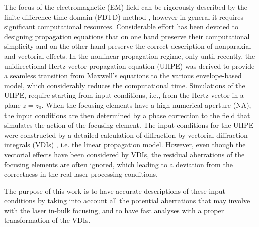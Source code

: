 \documentclass[9pt,twocolumn,twoside]{osajnl}
\begin{document}
The focus of the electromagnetic (EM) field can be rigorously described by the finite difference time domain (FDTD) method \cite{liu2000three}, however in general it requires significant computational resources. Considerable effort has been devoted to designing propagation equations that on one hand preserve their computational simplicity and on the other hand preserve the correct description of nonparaxial and vectorial effects. In the nonlinear propagation regime, only until recently, the unidirectional Hertz vector propagation equation (UHPE) \cite{couairon2015propagation, PhysRevE.100.033316} was derived to provide a seamless transition from Maxwell’s equations to the various envelope-based model, which considerably reduces the computational time. Simulations of the UHPE, require starting from input conditions, i.e., from the Hertz vector in a plane $z = z_0$. When the focusing elements have a high numerical aperture (NA), the input conditions are then determined by a phase correction to the field that simulates the action of the focusing element. The input conditions for the UHPE were constructed by a detailed calculation of diffraction by vectorial diffraction integrals (VDIs) \cite{varga2000focusing1,varga2000focusing2}, i.e. the linear propagation model. However, even though the vectorial effects have been considered by VDIs, the residual aberrations of the focusing elements are often ignored, which leading to a deviation from the correctness in the real laser processing conditions.

The purpose of this work is to have accurate descriptions of these input conditions by taking into account all the potential aberrations that may involve with the laser in-bulk focusing, and to have fast analyses with a proper transformation of the VDIs. 
\end{document}
